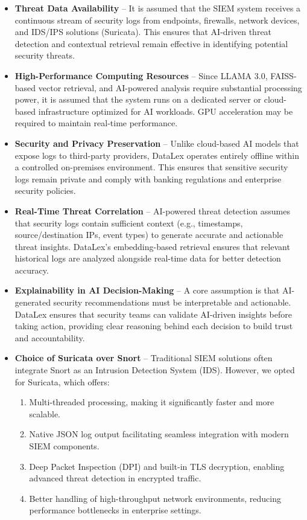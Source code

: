 \begin{itemize}
    \item \textbf{Threat Data Availability} -- It is assumed that the SIEM system receives a continuous stream of security logs from endpoints, firewalls, network devices, and IDS/IPS solutions (Suricata). This ensures that AI-driven threat detection and contextual retrieval remain effective in identifying potential security threats.

    \item \textbf{High-Performance Computing Resources} -- Since LLAMA 3.0, FAISS-based vector retrieval, and AI-powered analysis require substantial processing power, it is assumed that the system runs on a dedicated server or cloud-based infrastructure optimized for AI workloads. GPU acceleration may be required to maintain real-time performance.

    \item \textbf{Security and Privacy Preservation} -- Unlike cloud-based AI models that expose logs to third-party providers, DataLex operates entirely offline within a controlled on-premises environment. This ensures that sensitive security logs remain private and comply with banking regulations and enterprise security policies.

    \item \textbf{Real-Time Threat Correlation} -- AI-powered threat detection assumes that security logs contain sufficient context (e.g., timestamps, source/destination IPs, event types) to generate accurate and actionable threat insights. DataLex's embedding-based retrieval ensures that relevant historical logs are analyzed alongside real-time data for better detection accuracy.

    \item \textbf{Explainability in AI Decision-Making} -- A core assumption is that AI-generated security recommendations must be interpretable and actionable. DataLex ensures that security teams can validate AI-driven insights before taking action, providing clear reasoning behind each decision to build trust and accountability.

    \item \textbf{Choice of Suricata over Snort} -- Traditional SIEM solutions often integrate Snort as an Intrusion Detection System (IDS). However, we opted for Suricata, which offers:
    \begin{enumerate}
        \item[a.] Multi-threaded processing, making it significantly faster and more scalable.
        \item[b.] Native JSON log output facilitating seamless integration with modern SIEM components.
        \item[c.] Deep Packet Inspection (DPI) and built-in TLS decryption, enabling advanced threat detection in encrypted traffic.
        \item[d.] Better handling of high-throughput network environments, reducing performance bottlenecks in enterprise settings.
    \end{enumerate}


\end{itemize}
